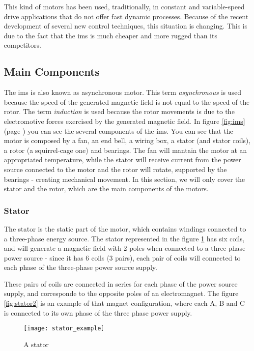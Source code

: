 This kind of motors has been used, traditionally, in constant and variable-speed drive applications that do not offer fast dynamic processes. Because of the recent development of several new control techniques, this situation is changing. This is due to the fact that the \acrfull{ims} is much cheaper and more rugged than its competitors.

\subsection{Main Components}

The \acrshort{ims} is also known as asynchronous motor. This term \emph{asynchronous} is used because the speed of the generated magnetic field is not equal to the speed of the rotor. The term \emph{induction} is used because the rotor movements is due to the electromotive forces exercised by the generated magnetic field.
In figure \ref{fig:ims} (page \pageref{fig:ims}) you can see the several components of the \acrshort{ims}. You can see that the motor is composed by a fan, an end bell, a wiring box, a stator (and stator coils), a rotor (a squirrel-cage one) and bearings. The fan will mantain the motor at an appropriated temperature, while the stator will receive current from the power source connected to the motor and the rotor will rotate, supported by the bearings - creating mechanical movement.
In this section, we will only cover the stator and the rotor, which are the main components of the motors. 

\subsubsection{Stator}

The stator is the static part of the motor, which contains windings connected to a three-phase energy source. The stator represented in the figure \ref{fig:stator1} has six coils, and will generate a magnetic field with 2 poles when connected to a three-phase power source - since it has 6 coils (3 pairs), each pair of coils will connected to each phase of the three-phase power source supply.

These pairs of coils are connected in series for each phase of the power source supply, and corresponde to the opposite poles of an electromagnet. The figure \ref{fig:stator2} is an example of that magnet configuration, where each A, B and C is connected to its own phase of the three phase power supply.


\begin{figure}[htbp]
	\centering
	\texttt{[image: stator\_example]}
	\caption{A stator}
	\label{fig:stator1}
\end{figure}

